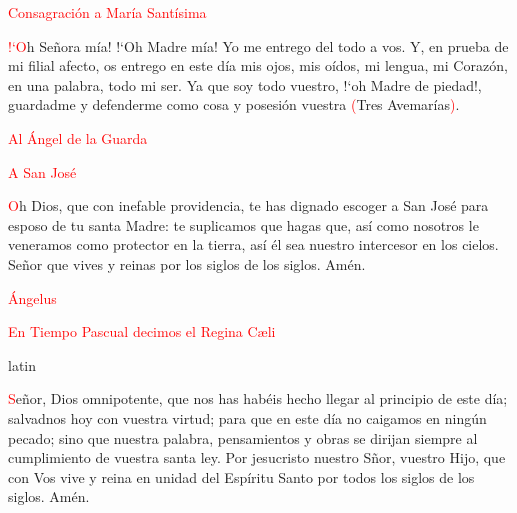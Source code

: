 \documentclass[9pt]{article}
\begin{document}
\begin{multicols}{2}
      \vspace{1mm}

      \textcolor{red}{Consagración a María Santísima}

      \textcolor{red}{{!`}O}h Señora mía! {!`}Oh Madre mía! Yo me entrego del todo a vos. Y, en prueba de mi filial afecto, os entrego en este día mis ojos, mis oídos, mi lengua, mi Corazón,
      en una palabra, todo mi ser. Ya que soy todo vuestro, {!`}oh Madre de piedad!, guardadme y defenderme como cosa y posesión vuestra \textcolor{red}{(}Tres Avemarías\textcolor{red}{)}.

      \vspace{1mm}

      \textcolor{red}{Al Ángel de la Guarda}

      

      \vspace{1mm}

      \textcolor{red}{A San José}

      \textcolor{red}{O}h Dios, que con inefable providencia, te has dignado escoger a San José  para esposo de tu santa Madre: te suplicamos que hagas que, así como nosotros le veneramos
      como protector en la tierra, así él sea nuestro intercesor en los cielos. Señor que vives y reinas por los siglos de los siglos. Amén.

      \vspace{1mm}

      \textcolor{red}{Ángelus}

      

      \vspace{2mm}

      \textcolor{red}{En Tiempo Pascual decimos el Regina C{\ae}li}

      \begin{otherlanguage*}{latin}
            
            
            \vspace{1mm}

            
      \end{otherlanguage*}

      \vspace{1mm}

      \textcolor{red}{S}eñor, Dios omnipotente, que nos has habéis hecho llegar al principio de este día; salvadnos hoy con vuestra virtud; para que en este día no caigamos en ningún pecado;
      sino que nuestra palabra, pensamientos y obras se dirijan siempre al cumplimiento de vuestra santa ley. Por jesucristo nuestro Sñor, vuestro Hijo, que con Vos vive y reina en unidad
      del Espíritu Santo por todos los siglos de los siglos. Amén.\\[2mm]
      
\end{multicols}
\end{document}

